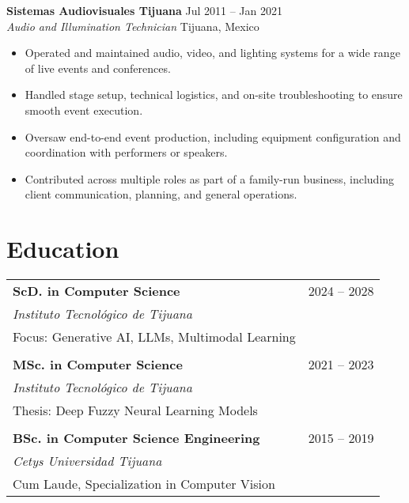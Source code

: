 \documentclass[letterpaper,11pt]{article}
\newcommand{\resumeItem}[1]{\item{\small{#1}}}
\newcommand{\resumeSubheading}[4]{
  \vspace{1pt}\textbf{#1} \hfill #2\\
  {\emph{#3}} \hfill {\small #4}\\
}
\begin{document}
\resumeSubheading{Sistemas Audiovisuales Tijuana}{Jul 2011 -- Jan 2021}{Audio and Illumination Technician}{Tijuana, Mexico}
\begin{itemize}[leftmargin=0.15in]
  \resumeItem{Operated and maintained audio, video, and lighting systems for a wide range of live events and conferences.}
  \resumeItem{Handled stage setup, technical logistics, and on-site troubleshooting to ensure smooth event execution.}
  \resumeItem{Oversaw end-to-end event production, including equipment configuration and coordination with performers or speakers.}
  \resumeItem{Contributed across multiple roles as part of a family-run business, including client communication, planning, and general operations.}
\end{itemize}

\section*{Education}
\begin{tabularx}{\textwidth}{@{}Xr@{}}
\textbf{ScD. in Computer Science} & 2024 -- 2028 \\
\textit{Instituto Tecnológico de Tijuana} & \\
Focus: Generative AI, LLMs, Multimodal Learning & \\
\\[-1ex]
\textbf{MSc. in Computer Science} & 2021 -- 2023 \\
\textit{Instituto Tecnológico de Tijuana} & \\
Thesis: Deep Fuzzy Neural Learning Models & \\
\\[-1ex]
\textbf{BSc. in Computer Science Engineering} & 2015 -- 2019 \\
\textit{Cetys Universidad Tijuana} & \\
Cum Laude, Specialization in Computer Vision & \\
\end{tabularx}

\end{document}

